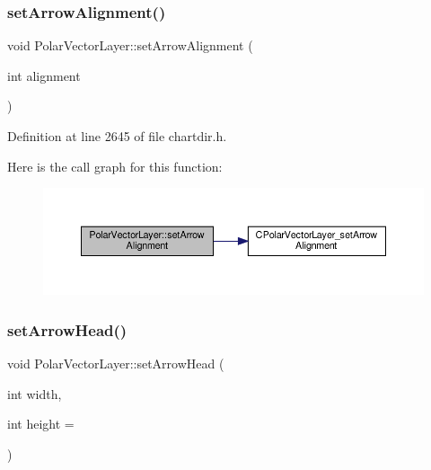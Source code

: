 \subsubsection{\texorpdfstring{set\+Arrow\+Alignment()}{setArrowAlignment()}}
{\footnotesize\ttfamily void Polar\+Vector\+Layer\+::set\+Arrow\+Alignment (\begin{DoxyParamCaption}\item[{int}]{alignment }\end{DoxyParamCaption})\hspace{0.3cm}{\ttfamily [inline]}}



Definition at line 2645 of file chartdir.\+h.

Here is the call graph for this function\+:
\nopagebreak
\begin{figure}[H]
\begin{center}
\leavevmode
\includegraphics[width=350pt]{class_polar_vector_layer_ad1005201a39bf1fe8922b18a315d2d4d_cgraph}
\end{center}
\end{figure}
\mbox{\label{class_polar_vector_layer_a739707bfc211f48475c65decff37ffb9}} 
\subsubsection{\texorpdfstring{set\+Arrow\+Head()}{setArrowHead()}\hspace{0.1cm}{\footnotesize\ttfamily [1/2]}}
{\footnotesize\ttfamily void Polar\+Vector\+Layer\+::set\+Arrow\+Head (\begin{DoxyParamCaption}\item[{int}]{width,  }\item[{int}]{height = {} }\end{DoxyParamCaption})\hspace{0.3cm}{\ttfamily [inline]}}



